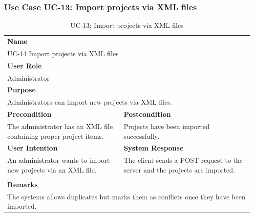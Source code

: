 \subsubsection{Use Case UC-13: Import projects via XML files}\label{subsubsec:use-case-uc-13:-import-projects-via-xml-files}

\begin{table}[H]
    \centering
    \begin{tabular}{|p{}|p{}|}

        \hline
        \multicolumn{2}{|l|}{\rowcolor{gray!50}\textbf{Name}} \\
        \multicolumn{2}{|l|}{UC-14 Import projects via XML files} \\ \hline

        \multicolumn{2}{|l|}{\rowcolor{gray!50}\textbf{User Role}} \\
        \multicolumn{2}{|l|}{Administrator} \\ \hline

        \multicolumn{2}{|l|}{\rowcolor{gray!50}\textbf{Purpose}} \\
        \multicolumn{2}{|l|}{Administrators can import new projects via XML files.} \\ \hline

        \rowcolor{gray!50}\textbf{Precondition} & \rowcolor{gray!50}\textbf{Postcondition} \\
        The administrator has an XML file containing proper project items.
        &
        Projects have been imported successfully.\\ \hline

        \rowcolor{gray!50}\textbf{User Intention} & \rowcolor{gray!50}\textbf{System Response} \\
        An administrator wants to import new projects via an XML file.
        &
        The client sends a POST request to the server and the projects are imported. \\ \hline

        & \\ \hline

        \multicolumn{2}{|l|}{\rowcolor{gray!50}\textbf{Remarks}} \\
        \multicolumn{2}{|p{1\textwidth}|}{The systems allows duplicates but marks them as conflicts once they have been imported.} \\ \hline
    \end{tabular}
    \caption{UC-13: Import projects via XML files}
    \label{tab:uc-import-projects-via-xml-files}
\end{table}

